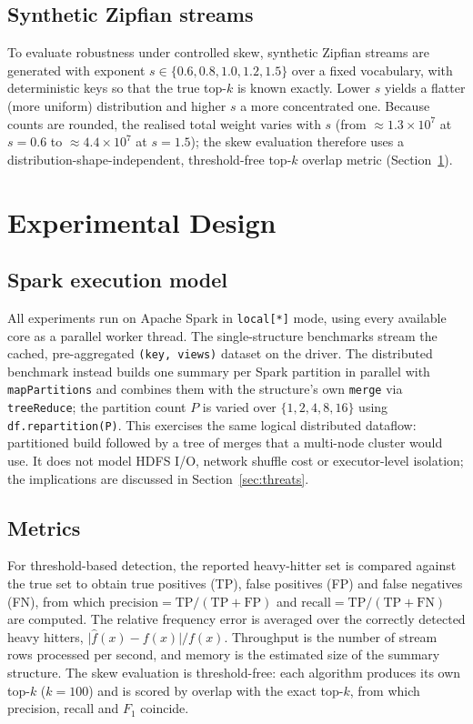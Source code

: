 \documentclass[12pt]{article}
\begin{document}
\subsection{Synthetic Zipfian streams}

To evaluate robustness under controlled skew, synthetic Zipfian streams are
generated with exponent $s \in \{0.6, 0.8, 1.0, 1.2, 1.5\}$ over a fixed
vocabulary, with deterministic keys so that the true top-$k$ is known exactly.
Lower $s$ yields a flatter (more uniform) distribution and higher $s$ a more
concentrated one. Because counts are rounded, the realised total weight varies
with $s$ (from $\approx 1.3\times10^7$ at $s=0.6$ to $\approx 4.4\times10^7$ at
$s=1.5$); the skew evaluation therefore uses a distribution-shape-independent,
threshold-free top-$k$ overlap metric (Section~\ref{sec:design}).

\section{Experimental Design}
\label{sec:design}

\subsection{Spark execution model}

All experiments run on Apache Spark in \texttt{local[*]} mode, using every
available core as a parallel worker thread. The single-structure benchmarks
stream the cached, pre-aggregated \texttt{(key, views)} dataset on the driver.
The distributed benchmark instead builds one summary per Spark partition in
parallel with \texttt{mapPartitions} and combines them with the structure's own
\texttt{merge} via \texttt{treeReduce}; the partition count $P$ is varied over
$\{1,2,4,8,16\}$ using \texttt{df.repartition(P)}. This exercises the same
logical distributed dataflow: partitioned build followed by a tree of merges
that a multi-node cluster would use. It does not model HDFS I/O, network
shuffle cost or executor-level isolation; the implications are discussed in
Section~\ref{sec:threats}.

\subsection{Metrics}

For threshold-based detection, the reported heavy-hitter set is compared against
the true set to obtain true positives (TP), false positives (FP) and false
negatives (FN), from which
$\text{precision} = \text{TP}/(\text{TP}+\text{FP})$ and
$\text{recall} = \text{TP}/(\text{TP}+\text{FN})$ are computed. The relative
frequency error is averaged over the correctly detected heavy hitters,
$\lvert \hat f(x) - f(x)\rvert / f(x)$. Throughput is the number of stream rows
processed per second, and memory is the estimated size of the summary structure.
The skew evaluation is threshold-free: each algorithm produces its own top-$k$
($k=100$) and is scored by overlap with the exact top-$k$, from which
precision, recall and $F_1$ coincide.
\end{document}
